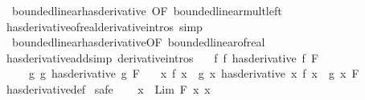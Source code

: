 \begin{isabellebody}
\ \ bounded{\isacharunderscore}{\kern0pt}linear{\isachardot}{\kern0pt}has{\isacharunderscore}{\kern0pt}derivative\ {\isacharbrackleft}{\kern0pt}OF\ bounded{\isacharunderscore}{\kern0pt}linear{\isacharunderscore}{\kern0pt}mult{\isacharunderscore}{\kern0pt}left{\isacharbrackright}{\kern0pt}\isanewline
\isanewline
{}\isamarkupfalse%
\ has{\isacharunderscore}{\kern0pt}derivative{\isacharunderscore}{\kern0pt}of{\isacharunderscore}{\kern0pt}real{\isacharbrackleft}{\kern0pt}derivative{\isacharunderscore}{\kern0pt}intros{\isacharcomma}{\kern0pt}\ simp{\isacharbrackright}{\kern0pt}\ {\isacharequal}{\kern0pt}\ \isanewline
\ \ bounded{\isacharunderscore}{\kern0pt}linear{\isachardot}{\kern0pt}has{\isacharunderscore}{\kern0pt}derivative{\isacharbrackleft}{\kern0pt}OF\ bounded{\isacharunderscore}{\kern0pt}linear{\isacharunderscore}{\kern0pt}of{\isacharunderscore}{\kern0pt}real{\isacharbrackright}{\kern0pt}\ \isanewline
\isanewline
{}\isamarkupfalse%
\ has{\isacharunderscore}{\kern0pt}derivative{\isacharunderscore}{\kern0pt}add{\isacharbrackleft}{\kern0pt}simp{\isacharcomma}{\kern0pt}\ derivative{\isacharunderscore}{\kern0pt}intros{\isacharbrackright}{\kern0pt}{\isacharcolon}{\kern0pt}\isanewline
\ \ \ f{\isacharcolon}{\kern0pt}\ {\isachardoublequoteopen}{\isacharparenleft}{\kern0pt}f\ has{\isacharunderscore}{\kern0pt}derivative\ f{\isacharprime}{\kern0pt}{\isacharparenright}{\kern0pt}\ F{\isachardoublequoteclose}\isanewline
\ \ \ \ \ g{\isacharcolon}{\kern0pt}\ {\isachardoublequoteopen}{\isacharparenleft}{\kern0pt}g\ has{\isacharunderscore}{\kern0pt}derivative\ g{\isacharprime}{\kern0pt}{\isacharparenright}{\kern0pt}\ F{\isachardoublequoteclose}\isanewline
\ \ \ {\isachardoublequoteopen}{\isacharparenleft}{\kern0pt}{\isacharparenleft}{\kern0pt}{\isasymlambda}x{\isachardot}{\kern0pt}\ f\ x\ {\isacharplus}{\kern0pt}\ g\ x{\isacharparenright}{\kern0pt}\ has{\isacharunderscore}{\kern0pt}derivative\ {\isacharparenleft}{\kern0pt}{\isasymlambda}x{\isachardot}{\kern0pt}\ f{\isacharprime}{\kern0pt}\ x\ {\isacharplus}{\kern0pt}\ g{\isacharprime}{\kern0pt}\ x{\isacharparenright}{\kern0pt}{\isacharparenright}{\kern0pt}\ F{\isachardoublequoteclose}\isanewline
%
\isadelimproof
\ \ %
\endisadelimproof
%
\isatagproof
{}\isamarkupfalse%
\ has{\isacharunderscore}{\kern0pt}derivative{\isacharunderscore}{\kern0pt}def\isanewline
{}\isamarkupfalse%
\ safe\isanewline
\ \ \isamarkupfalse%
\ {\isacharquery}{\kern0pt}x\ {\isacharequal}{\kern0pt}\ {\isachardoublequoteopen}Lim\ F\ {\isacharparenleft}{\kern0pt}{\isasymlambda}x{\isachardot}{\kern0pt}\ x{\isacharparenright}{\kern0pt}{\isachardoublequoteclose}\isanewline

\end{isabellebody}
